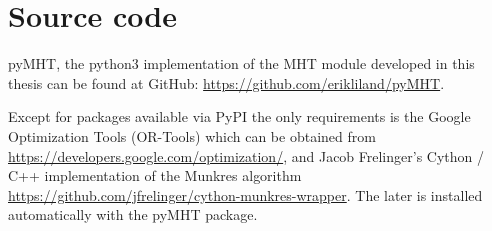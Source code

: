
\chapter{Source code}
pyMHT, the \gls{python}3 implementation of the MHT module developed in this thesis can be found at GitHub: \url{https://github.com/erikliland/pyMHT}.

Except for packages available via PyPI the only requirements is the Google Optimization Tools (OR-Tools) which can be obtained from \url{https://developers.google.com/optimization/}, and Jacob Frelinger's Cython / C++ implementation of the Munkres algorithm \url{https://github.com/jfrelinger/cython-munkres-wrapper}. The later is installed automatically with the pyMHT package.